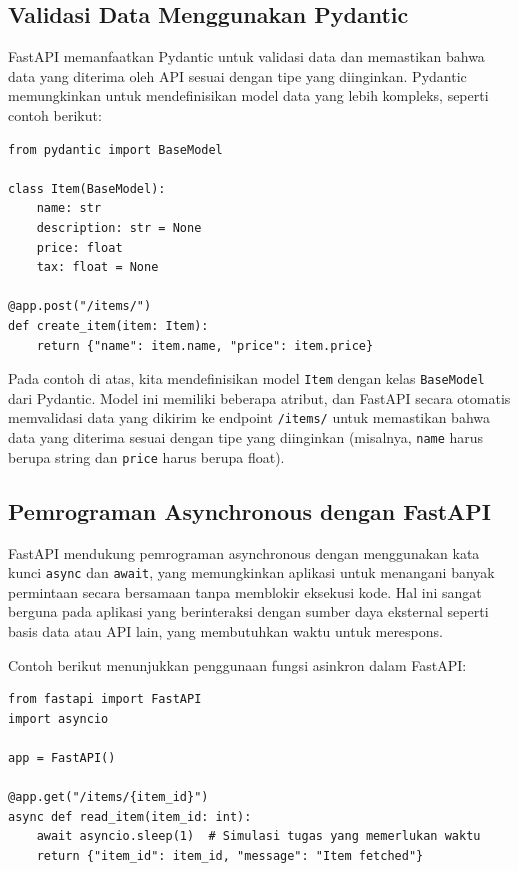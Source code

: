\subsection{Validasi Data Menggunakan Pydantic}
FastAPI memanfaatkan Pydantic untuk validasi data dan memastikan bahwa data yang diterima oleh API sesuai dengan tipe yang diinginkan. Pydantic memungkinkan untuk mendefinisikan model data yang lebih kompleks, seperti contoh berikut:

\begin{verbatim}
from pydantic import BaseModel

class Item(BaseModel):
    name: str
    description: str = None
    price: float
    tax: float = None

@app.post("/items/")
def create_item(item: Item):
    return {"name": item.name, "price": item.price}
\end{verbatim}

Pada contoh di atas, kita mendefinisikan model \texttt{Item} dengan kelas \texttt{BaseModel} dari Pydantic. Model ini memiliki beberapa atribut, dan FastAPI secara otomatis memvalidasi data yang dikirim ke endpoint \texttt{/items/} untuk memastikan bahwa data yang diterima sesuai dengan tipe yang diinginkan (misalnya, \texttt{name} harus berupa string dan \texttt{price} harus berupa float).

\subsection{Pemrograman Asynchronous dengan FastAPI}
FastAPI mendukung pemrograman asynchronous dengan menggunakan kata kunci \texttt{async} dan \texttt{await}, yang memungkinkan aplikasi untuk menangani banyak permintaan secara bersamaan tanpa memblokir eksekusi kode. Hal ini sangat berguna pada aplikasi yang berinteraksi dengan sumber daya eksternal seperti basis data atau API lain, yang membutuhkan waktu untuk merespons.

Contoh berikut menunjukkan penggunaan fungsi asinkron dalam FastAPI:

\begin{verbatim}
from fastapi import FastAPI
import asyncio

app = FastAPI()

@app.get("/items/{item_id}")
async def read_item(item_id: int):
    await asyncio.sleep(1)  # Simulasi tugas yang memerlukan waktu
    return {"item_id": item_id, "message": "Item fetched"}
\end{verbatim}

